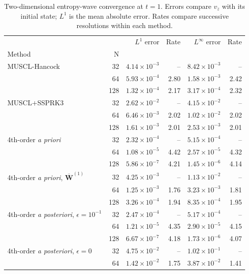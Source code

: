 \begin{table}
\caption{Two-dimensional entropy-wave convergence at $t=1$. Errors compare $v_z$ with its initial state; $L^1$ is the mean absolute error. Rates compare successive resolutions within each method.}
\label{tab:entropy-wave-convergence-2d}
\begin{tabular}{lrrrrr}
\toprule
 &  & $L^1$ error & Rate & $L^\infty$ error & Rate \\
Method & N &  &  &  &  \\
\midrule
MUSCL-Hancock & 32 & $4.14 \times 10^{-3}$ & -- & $8.42 \times 10^{-3}$ & -- \\
 & 64 & $5.93 \times 10^{-4}$ & 2.80 & $1.58 \times 10^{-3}$ & 2.42 \\
 & 128 & $1.32 \times 10^{-4}$ & 2.17 & $3.17 \times 10^{-4}$ & 2.32 \\
MUSCL$+$SSPRK3 & 32 & $2.62 \times 10^{-2}$ & -- & $4.15 \times 10^{-2}$ & -- \\
 & 64 & $6.46 \times 10^{-3}$ & 2.02 & $1.02 \times 10^{-2}$ & 2.02 \\
 & 128 & $1.61 \times 10^{-3}$ & 2.01 & $2.53 \times 10^{-3}$ & 2.01 \\
4th-order \textit{a priori} & 32 & $2.32 \times 10^{-4}$ & -- & $5.15 \times 10^{-4}$ & -- \\
 & 64 & $1.08 \times 10^{-5}$ & 4.42 & $2.57 \times 10^{-5}$ & 4.32 \\
 & 128 & $5.86 \times 10^{-7}$ & 4.21 & $1.45 \times 10^{-6}$ & 4.14 \\
4th-order \textit{a priori}, $\overline{\boldsymbol{W}}^{(1)}$ & 32 & $4.25 \times 10^{-3}$ & -- & $1.13 \times 10^{-2}$ & -- \\
 & 64 & $1.25 \times 10^{-3}$ & 1.76 & $3.23 \times 10^{-3}$ & 1.81 \\
 & 128 & $3.26 \times 10^{-4}$ & 1.94 & $8.35 \times 10^{-4}$ & 1.95 \\
4th-order \textit{a posteriori}, $\epsilon=10^{-1}$ & 32 & $2.47 \times 10^{-4}$ & -- & $5.17 \times 10^{-4}$ & -- \\
 & 64 & $1.21 \times 10^{-5}$ & 4.35 & $2.90 \times 10^{-5}$ & 4.15 \\
 & 128 & $6.67 \times 10^{-7}$ & 4.18 & $1.73 \times 10^{-6}$ & 4.07 \\
4th-order \textit{a posteriori}, $\epsilon=0$ & 32 & $4.75 \times 10^{-2}$ & -- & $1.02 \times 10^{-1}$ & -- \\
 & 64 & $1.42 \times 10^{-2}$ & 1.75 & $3.87 \times 10^{-2}$ & 1.41 \\

\end{tabular}
\end{table}
